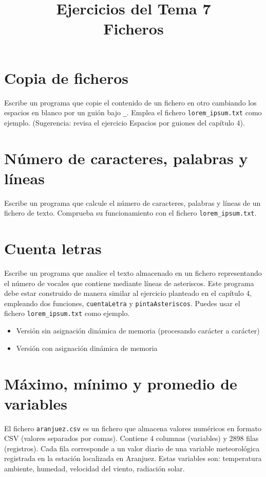 \documentclass[a4paper]{article}
\date{}
\title{Ejercicios del Tema 7\\\medskip
\large Ficheros}
\begin{document}
\maketitle

\section{Copia de ficheros}
\label{sec:org26b32f6}
Escribe	un programa que copie el contenido de un fichero en otro cambiando los espacios en blanco por un guión bajo \texttt{\_}. Emplea el fichero \texttt{lorem\_ipsum.txt} como ejemplo. (Sugerencia: revisa el ejercicio \guillemotleft{}Espacios por guiones\guillemotright{} del capítulo 4).

\section{Número de caracteres, palabras y líneas}
\label{sec:org5576622}

Escribe un programa que calcule el número de caracteres, palabras y líneas de un fichero de texto. Comprueba su funcionamiento con el fichero \texttt{lorem\_ipsum.txt}. 

\section{Cuenta letras}
\label{sec:org1d52c77}

Escribe un programa que analice el texto almacenado en un fichero representando el número de vocales que contiene mediante líneas de asteriscos. Este programa debe estar construido de manera similar al ejercicio planteado en el capítulo 4, empleando dos funciones, \texttt{cuentaLetra} y \texttt{pintaAsteriscos}. Puedes usar el fichero \texttt{lorem\_ipsum.txt} como ejemplo.

\begin{itemize}
\item Versión sin asignación dinámica de memoria (procesando carácter a carácter)
\item Versión con asignación dinámica de memoria
\end{itemize}
\section{Máximo, mínimo y promedio de variables}
\label{sec:orgc25bcae}

El fichero \texttt{aranjuez.csv} es un fichero que almacena valores numéricos en formato CSV (valores separados por comas). Contiene 4 columnas (variables) y 2898 filas (registros). Cada fila corresponde a un valor diario de una variable meteorológica registrada en la estación localizada en Aranjuez. Estas variables son: temperatura ambiente, humedad, velocidad del viento, radiación solar.
\end{document}
